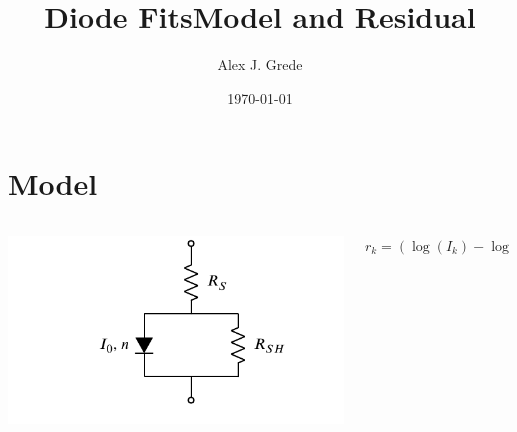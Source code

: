 \documentclass{beamer}
\title[Diode Fits]{Diode Fits}
\author[Grede]{Alex J. Grede}
\institute[RIT]{Rochester Institute of Technology}
\date{\today}
\begin{document}
\begin{frame}
\titlepage
\end{frame}

\section{Model}
\label{sec:model}


\begin{frame}
  \title{Model and Residual}
  \begin{columns}[T]
    \begin{column}{0.45\textwidth}
      \includegraphics[width=\textwidth]{model}
    \end{column}
    \begin{column}{0.45\textwidth}
      \begin{equation}
        \label{eq:1}
        r_{k} = \left( \log\left( I_{k} \right) - \log \left( I\left( V_{k} \right) \right) \right)^2
      \end{equation}
    \end{column}
  \end{columns}
\end{frame}


\end{document}
